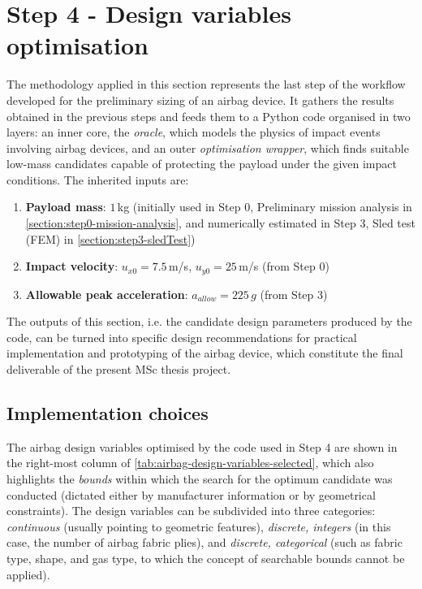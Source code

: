 \section{Step 4 - Design variables optimisation}\label{section:optimisation-code}
The methodology applied in this section represents the last step of the workflow developed for the preliminary sizing of an airbag device. It gathers the results obtained in the previous steps and feeds them to a Python code organised in two layers: an inner core, the \textit{oracle}, which models the physics of impact events involving airbag devices, and an outer \textit{optimisation wrapper}, which finds suitable low-mass candidates capable of protecting the payload under the given impact conditions. The inherited inputs are:
\begin{enumerate}
  \item \textbf{Payload mass}: $1$\,kg (initially used in Step 0, Preliminary mission analysis in \cref{section:step0-mission-analysis}, and numerically estimated in Step 3, Sled test (FEM) in \cref{section:step3-sledTest})
  \item \textbf{Impact velocity}: $u_{x0} = 7.5$\,m/s, $u_{y0} = 25$\,m/s (from Step 0)
  \item \textbf{Allowable peak acceleration}: $a_{allow} = 225$\,$g$ (from Step 3)
\end{enumerate}

The outputs of this section, i.e. the candidate design parameters produced by the code, can be turned into specific design recommendations for practical implementation and prototyping of the airbag device, which constitute the final deliverable of the present MSc thesis project.

\subsection{Implementation choices}
The airbag design variables optimised by the code used in Step 4 are shown in the right-most column of \cref{tab:airbag-design-variables-selected}, which also highlights the \textit{bounds} within which the search for the optimum candidate was conducted (dictated either by manufacturer information or by geometrical constraints). The design variables can be subdivided into three categories: \textit{continuous} (usually pointing to geometric features), \textit{discrete, integers} (in this case, the number of airbag fabric plies), and \textit{discrete, categorical} (such as fabric type, shape, and gas type, to which the concept of searchable bounds cannot be applied). 


